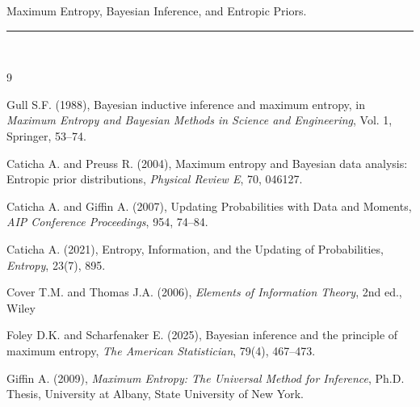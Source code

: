 \documentclass[twoside]{article}
\begin{document}
 

 
Maximum Entropy, Bayesian Inference, and Entropic Priors.  \\
\hspace{1cm}\rule{\textwidth}{0.2mm}\\


\begin{thebibliography}{9}


Gull S.F. (1988), Bayesian inductive inference and maximum entropy,
in {\it Maximum Entropy and Bayesian Methods in Science and Engineering},
Vol. 1, Springer, 53--74.

Caticha A. and Preuss R. (2004), Maximum entropy and Bayesian data analysis:
Entropic prior distributions, {\it Physical Review E}, 70, 046127.

Caticha A. and Giffin A. (2007), Updating Probabilities with Data and Moments,
{\it AIP Conference Proceedings}, 954, 74--84.

Caticha A. (2021), Entropy, Information, and the Updating of Probabilities,
{\it Entropy}, 23(7), 895.

Cover T.M. and Thomas J.A. (2006),
{\it Elements of Information Theory},
2nd ed., Wiley



Foley D.K. and Scharfenaker E. (2025), Bayesian inference and the principle of maximum entropy,
{\it The American Statistician}, 79(4), 467--473.

Giffin A. (2009),
\emph{Maximum Entropy: The Universal Method for Inference},
Ph.D. Thesis, University at Albany, State University of New York.

\end{thebibliography}


 
\end{document}
